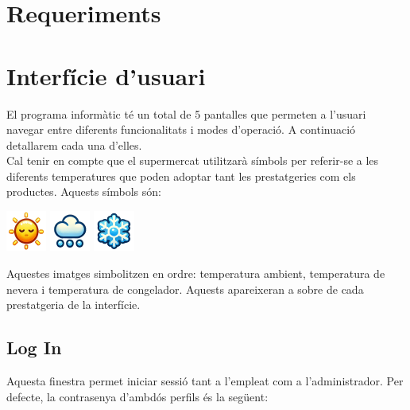 \documentclass[a4paper,12pt]{article}
\begin{document}
	\section{Requeriments}
	
	\newpage
	\section{Interfície d'usuari}
	
	El programa informàtic té un total de 5 pantalles que permeten a l'usuari navegar entre diferents funcionalitats i modes d'operació. A continuació detallarem cada una d'elles. \\
	
	Cal tenir en compte que el supermercat utilitzarà símbols per referir-se a les diferents temperatures que poden adoptar tant les prestatgeries com els productes. Aquests símbols són:
	
	\begin{center}
		\includegraphics[width=0.1\textwidth]{assets/AMBIENT.png} %
		\hspace{1cm}
		\includegraphics[width=0.1\textwidth]{assets/REFRIGERATED.png} %
		\hspace{1cm} %
		\includegraphics[width=0.1\textwidth]{assets/FROZEN.png} %
	\end{center}
	
	Aquestes imatges simbolitzen en ordre: temperatura ambient, temperatura de nevera i temperatura de congelador. Aquests apareixeran a sobre de cada prestatgeria de la interfície.
	
	\newpage
	\subsection{Log In}
	\label{sec:logIn}
	
	Aquesta finestra permet iniciar sessió tant a l'empleat com a l'administrador. Per defecte, la contrasenya d'ambdós perfils és la següent:
	
\end{document}
